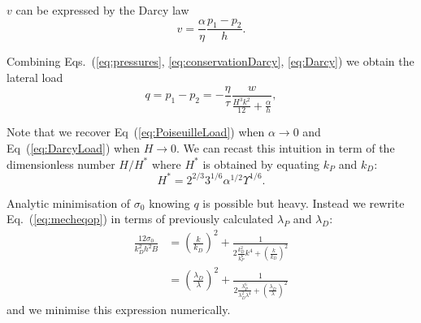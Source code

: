 \documentclass[twocolumn,superscriptaddress,showpacs,preprintnumbers,amsmath,amssymb,prl]{revtex4-1}
\begin{document}
$v$ can be expressed by the Darcy law
\begin{equation}
v = \frac{\alpha}{\eta} \frac{p_1-p_2}{h}.
\label{eq:Darcy}
\end{equation}

Combining Eqs.~(\ref{eq:pressures}, \ref{eq:conservationDarcy}, \ref{eq:Darcy}) we obtain the lateral load
\begin{equation}
q = p_1-p_2 = - \frac{\eta}{\tau} \frac{w}{\frac{H^3 k^2}{12} + \frac{\alpha}{h}},
\label{eq:MixtLoad}
\end{equation}

Note that we recover Eq~(\ref{eq:PoiseuilleLoad}) when $\alpha \rightarrow 0$ and Eq~(\ref{eq:DarcyLoad}) when $H \rightarrow 0$. We can recast this intuition in term of the dimensionless number $H/H^*$ where $H^*$ is obtained by equating $k_P$ and $k_D$:
\begin{equation}
H^* = 2^{2/3} 3^{1/6} \alpha^{1/2} \Upsilon^{1/6}.
\end{equation}

Analytic minimisation of $\sigma_0$ knowing $q$ is possible but heavy. Instead we rewrite Eq.~(\ref{eq:mecheqop}) in terms of previously calculated $\lambda_P$ and $\lambda_D$:
\begin{align}
\frac{12\sigma_0}{k_D^2 h^2 B} &= \left(\frac{k}{k_D}\right)^2 + \frac{1}{2\frac{k_D^2}{k_P^6}k^4  + \left(\frac{k}{k_D}\right)^2}\\
&= \left(\frac{\lambda_D}{\lambda}\right)^2 + \frac{1}{2\frac{\lambda_P^6}{\lambda_D^2\lambda^4}  + \left(\frac{\lambda_D}{\lambda}\right)^2}
\end{align}
and we minimise this expression numerically.
\end{document}
